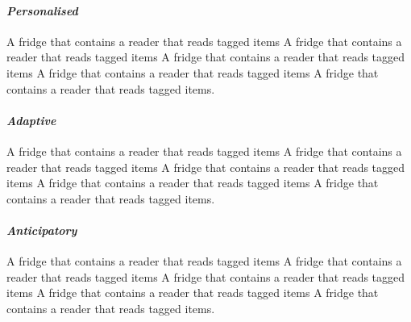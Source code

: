 \documentclass[a4paper, 11pt]{article}
\begin{document}
   \paragraph{\textbf{\textit{Personalised}}}
 \begin{flushleft}  A fridge that contains a reader that reads tagged items A fridge that contains a reader that reads tagged items A fridge that contains a reader that reads tagged items A fridge that contains a reader that reads tagged items A fridge that contains a reader that reads tagged items.
  \end{flushleft}
  
   \paragraph{\textbf{\textit{Adaptive}}}
 \begin{flushleft}  A fridge that contains a reader that reads tagged items A fridge that contains a reader that reads tagged items A fridge that contains a reader that reads tagged items A fridge that contains a reader that reads tagged items A fridge that contains a reader that reads tagged items.
  \end{flushleft}
  
     \paragraph{\textbf{\textit{Anticipatory}}}
 \begin{flushleft}  A fridge that contains a reader that reads tagged items A fridge that contains a reader that reads tagged items A fridge that contains a reader that reads tagged items A fridge that contains a reader that reads tagged items A fridge that contains a reader that reads tagged items.
  \end{flushleft}
\fi
\end{document}
